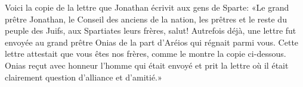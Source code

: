 Voici la copie de la lettre que Jonathan écrivit aux gens de Sparte:
«Le grand prêtre Jonathan, le Conseil des anciens de la nation,
	les prêtres et le reste du peuple des Juifs,
	aux Spartiates leurs frères, salut!
Autrefois déjà, une lettre fut envoyée au grand prêtre Onias
	de la part d’Aréios qui régnait parmi vous.
Cette lettre attestait que vous êtes nos frères, comme le montre la copie ci-dessous.
Onias reçut avec honneur l’homme qui était envoyé
	et prit la lettre où il était clairement question d’alliance et d’amitié.»
